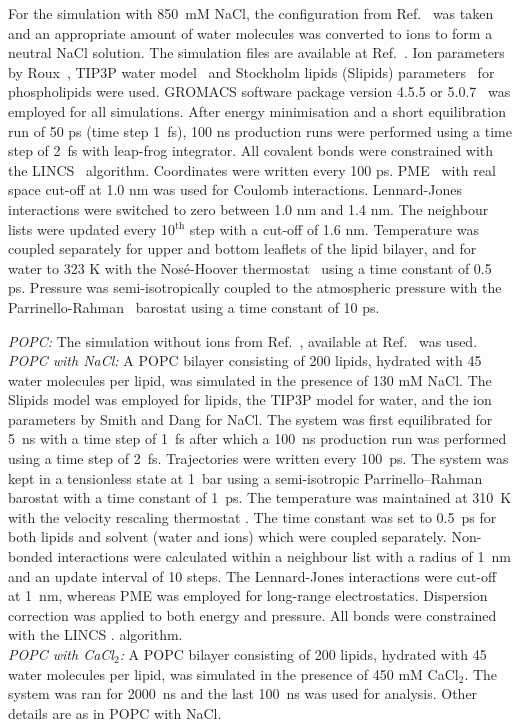\documentclass[twoside,twocolumn,9pt]{article}
\begin{document}
For the simulation with 850~mM NaCl, the configuration from Ref.~ was taken and 
an appropriate amount of water molecules was converted to ions to form a neutral NaCl solution. 
The simulation files are available at Ref.~. 
%
Ion parameters by Roux~\cite{beglov94,roux96}, TIP3P water model~\cite{jorgensen83} and 
Stockholm lipids (Slipids) parameters~\cite{jambeck12,jambeck12b} for phospholipids were used. 
GROMACS software package version 4.5.5 or 5.0.7~\cite{pronk13} was employed for all simulations. 
After energy 
minimisation and a short equilibration run of 50 ps (time step 1~fs), 100 ns production runs were performed using 
a time step of 2~fs with leap-frog integrator. All covalent bonds were constrained with the LINCS~\cite{hess97,hess07}
algorithm. Coordinates were written every 100 ps. PME~\cite{darden93,essman95} with real space cut-off at 1.0 nm was used for Coulomb 
interactions. Lennard-Jones interactions were switched to zero between 1.0 nm and 1.4 nm. The neighbour 
lists were updated every 10$^\mathrm{th}$ step with a cut-off of 1.6 nm. Temperature was coupled separately for upper and 
bottom leaflets of the lipid bilayer, and for water to 323 K with the Nos\'e-Hoover thermostat~\cite{nose84,hoover85} using 
a time constant of 0.5 ps. Pressure was semi-isotropically coupled to the atmospheric pressure 
with the Parrinello-Rahman~\cite{parrinello81} barostat using a time constant of 10 ps.


{\it POPC:} The simulation without ions from Ref.~, available at Ref.~ was used. \\
{\it POPC with NaCl:}
A POPC bilayer consisting of 200 lipids, hydrated with 45 water molecules per lipid, 
was simulated in the presence of 130 mM NaCl. 
The Slipids model \cite{jambeck12,jambeck12b}
was employed for lipids, the TIP3P model \cite{jorgensen83} for water, and the ion parameters by Smith 
and Dang \cite{smith94} for NaCl. The system was first
equilibrated for 5~ns with a time step of 1~fs after which a 100~ns production run was performed using
a time step of 2~fs. Trajectories were written every 100~ps. The system was kept in a tensionless state at 1~bar 
using a semi-isotropic Parrinello--Rahman barostat \cite{parrinello81} with a time constant of 1~ps. 
The temperature was maintained at 310~K
with the velocity rescaling thermostat \cite{bussi07}. The time constant was set to 0.5~ps for both lipids and 
solvent (water and ions) which were coupled separately. Non-bonded interactions were calculated
within a neighbour list with a radius of 1~nm and an update interval of 10 steps. The Lennard-Jones
interactions were cut-off at 1~nm, whereas PME \cite{darden93,essman95} was employed for long-range electrostatics. 
Dispersion correction was applied to both energy and pressure. All bonds were constrained with the LINCS \cite{hess97,hess07}.
algorithm. \\
{\it POPC with CaCl$_2$:} A POPC bilayer consisting of 200 lipids, hydrated with 45 water molecules per lipid, 
was simulated in the presence of 450 mM CaCl$_2$. The system was ran for 2000~ns and the last 100~ns was used 
for analysis. Other details are as in POPC with NaCl.
\end{document}
